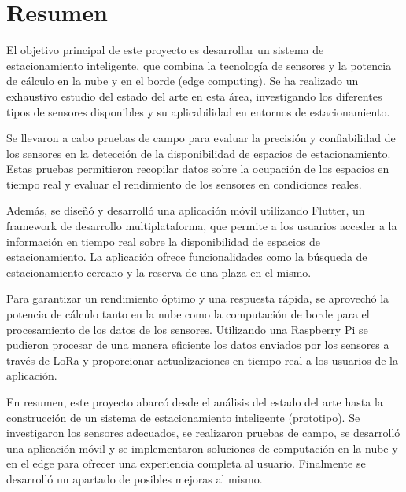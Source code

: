 \section*{Resumen}
El objetivo principal de este proyecto es desarrollar un sistema de estacionamiento inteligente, que combina la tecnología de sensores y la potencia de cálculo en la nube y en el borde (edge computing). Se ha realizado un exhaustivo estudio del estado del arte en esta área, investigando los diferentes tipos de sensores disponibles y su aplicabilidad en entornos de estacionamiento.


Se llevaron a cabo pruebas de campo para evaluar la precisión y confiabilidad de los sensores en la detección de la disponibilidad de espacios de estacionamiento. Estas pruebas permitieron recopilar datos sobre la ocupación de los espacios en tiempo real y evaluar el rendimiento de los sensores en condiciones reales.


Además, se diseñó y desarrolló una aplicación móvil utilizando Flutter, un framework de desarrollo multiplataforma, que permite a los usuarios acceder a la información en tiempo real sobre la disponibilidad de espacios de estacionamiento. La aplicación ofrece funcionalidades como la búsqueda de estacionamiento cercano y la reserva de una plaza en el mismo.


Para garantizar un rendimiento óptimo y una respuesta rápida, se aprovechó la potencia de cálculo tanto en la nube como la computación de borde para el procesamiento de los datos de los sensores. Utilizando una Raspberry Pi se pudieron procesar de una manera eficiente los datos enviados por los sensores a través de LoRa y proporcionar actualizaciones en tiempo real a los usuarios de la aplicación.


En resumen, este proyecto abarcó desde el análisis del estado del arte hasta la construcción de un sistema de estacionamiento inteligente (prototipo). Se investigaron los sensores adecuados, se realizaron pruebas de campo, se desarrolló una aplicación móvil y se implementaron soluciones de computación en la nube y en el edge para ofrecer una experiencia completa al usuario. Finalmente se desarrolló un apartado de posibles mejoras al mismo.
